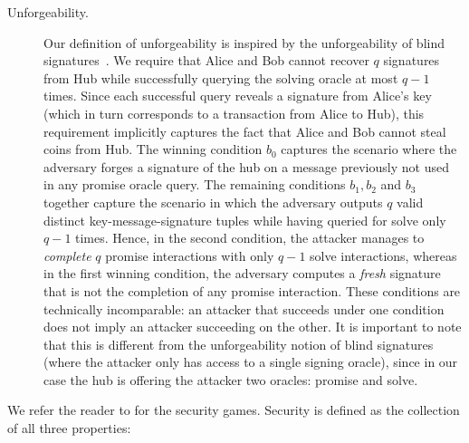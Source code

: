 \begin{description}
    \item[Unforgeability.] Our definition of unforgeability is inspired by the unforgeability of blind signatures~\cite{C:Chaum82}. We require that Alice and Bob cannot recover $q$ signatures from Hub while successfully querying the solving oracle at most $q-1$ times. Since each successful query reveals a signature from Alice's key (which in turn corresponds to a transaction from Alice to Hub), this requirement implicitly captures the fact that Alice and Bob cannot steal coins from Hub. The winning condition $b_0$ captures the scenario where the adversary forges a signature of the hub on a message previously not used in any promise oracle query.
    The remaining conditions $b_1, b_2$ and $b_3$ together capture the scenario in which the adversary outputs $q$ valid distinct key-message-signature tuples while having queried for solve only $q-1$ times. Hence, in the second condition, the attacker manages to \emph{complete} $q$ promise interactions with only $q-1$ solve interactions, whereas in the first winning condition, the adversary computes a \emph{fresh} signature that is not the completion of any promise interaction. These conditions are technically incomparable: an attacker that succeeds under one condition does not imply an attacker succeeding on the other.
    It is important to note that this is different from the unforgeability notion of blind signatures (where the attacker only has access to a single signing oracle), since in our case the hub is offering the attacker two oracles: promise and solve.
\end{description}

% 

We refer the reader to \cite{CCS:GMMMTT22} for the security games. Security is defined as the collection of all three properties:

